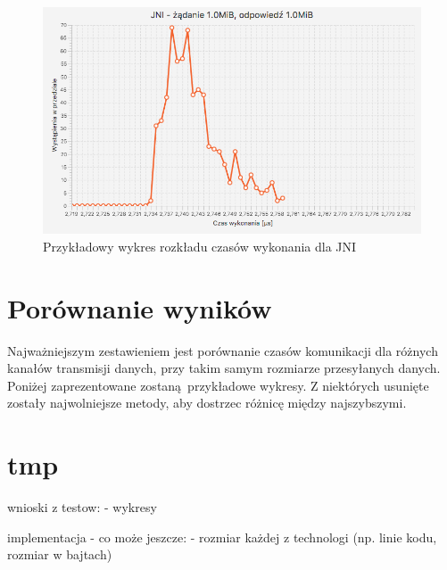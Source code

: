 \begin{figure}[H]
    \centering
    \includegraphics[scale=0.38]{img/charts/JNI_chart_1048576_1048576.png}
    \caption{Przykładowy wykres rozkładu czasów wykonania dla JNI}
\end{figure}


\section{Porównanie wyników}

Najważniejszym zestawieniem jest porównanie czasów komunikacji dla różnych kanałów transmisji danych, przy takim samym rozmiarze przesyłanych danych. Poniżej zaprezentowane zostaną przykładowe wykresy. Z niektórych usunięte zostały najwolniejsze metody, aby dostrzec różnicę między najszybszymi.


\section{tmp}

wnioski z testow:
- wykresy

implementacja - co może jeszcze:
- rozmiar każdej z technologi (np. linie kodu, rozmiar w bajtach)
